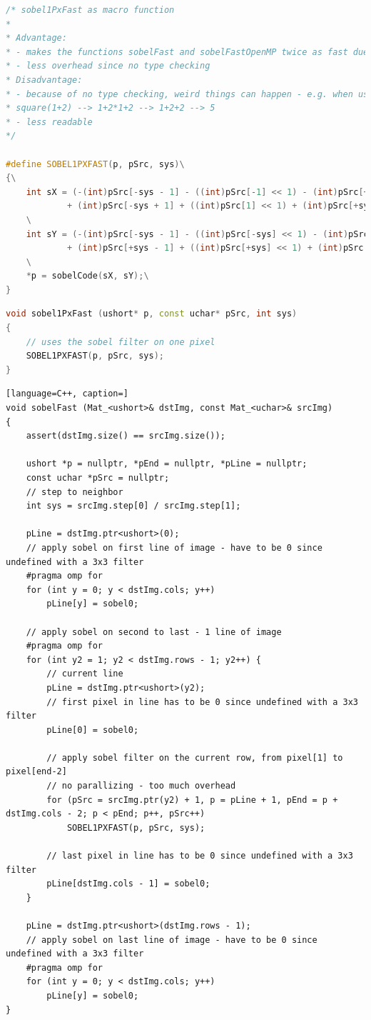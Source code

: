 \documentclass{ezb}
\begin{document}
\begin{lstlisting}[language=C++, caption=sobel1PxFast as macro function for an even better performance]
/* sobel1PxFast as macro function
* 
* Advantage:
* - makes the functions sobelFast and sobelFastOpenMP twice as fast due to forced inlining
* - less overhead since no type checking
* Disadvantage:
* - because of no type checking, weird things can happen - e.g. when used with expressions such as (1+2): #define square(a) a*a
* square(1+2) --> 1+2*1+2 --> 1+2+2 --> 5 
* - less readable
*/

#define SOBEL1PXFAST(p, pSrc, sys)\
{\
	int sX = (-(int)pSrc[-sys - 1] - ((int)pSrc[-1] << 1) - (int)pSrc[+sys - 1]\
			+ (int)pSrc[-sys + 1] + ((int)pSrc[1] << 1) + (int)pSrc[+sys + 1] + 3) >> 3;\
	\
	int sY = (-(int)pSrc[-sys - 1] - ((int)pSrc[-sys] << 1) - (int)pSrc[-sys + 1]\
			+ (int)pSrc[+sys - 1] + ((int)pSrc[+sys] << 1) + (int)pSrc[+sys + 1] + 3) >> 3;\
	\
	*p = sobelCode(sX, sY);\
}
\end{lstlisting}
\newpage
\begin{lstlisting}[language=C++, caption=Core routine for \textbackslash c sobelFast]
void sobel1PxFast (ushort* p, const uchar* pSrc, int sys)
{
	// uses the sobel filter on one pixel
	SOBEL1PXFAST(p, pSrc, sys);
}
\end{lstlisting}

\begin{lstlisting}[language=C++, caption=]
void sobelFast (Mat_<ushort>& dstImg, const Mat_<uchar>& srcImg)
{
	assert(dstImg.size() == srcImg.size()); 

	ushort *p = nullptr, *pEnd = nullptr, *pLine = nullptr; 
	const uchar *pSrc = nullptr; 
	// step to neighbor
	int sys = srcImg.step[0] / srcImg.step[1];

	pLine = dstImg.ptr<ushort>(0);
	// apply sobel on first line of image - have to be 0 since undefined with a 3x3 filter
	#pragma omp for
	for (int y = 0; y < dstImg.cols; y++)
		pLine[y] = sobel0;

	// apply sobel on second to last - 1 line of image
	#pragma omp for
	for (int y2 = 1; y2 < dstImg.rows - 1; y2++) {
		// current line
		pLine = dstImg.ptr<ushort>(y2);
		// first pixel in line has to be 0 since undefined with a 3x3 filter
		pLine[0] = sobel0;

		// apply sobel filter on the current row, from pixel[1] to pixel[end-2]
		// no parallizing - too much overhead
		for (pSrc = srcImg.ptr(y2) + 1, p = pLine + 1, pEnd = p + dstImg.cols - 2; p < pEnd; p++, pSrc++)
			SOBEL1PXFAST(p, pSrc, sys);

		// last pixel in line has to be 0 since undefined with a 3x3 filter
		pLine[dstImg.cols - 1] = sobel0;
	}

	pLine = dstImg.ptr<ushort>(dstImg.rows - 1);
	// apply sobel on last line of image - have to be 0 since undefined with a 3x3 filter
	#pragma omp for
	for (int y = 0; y < dstImg.cols; y++)
		pLine[y] = sobel0;
}
\end{lstlisting}
\end{document}

